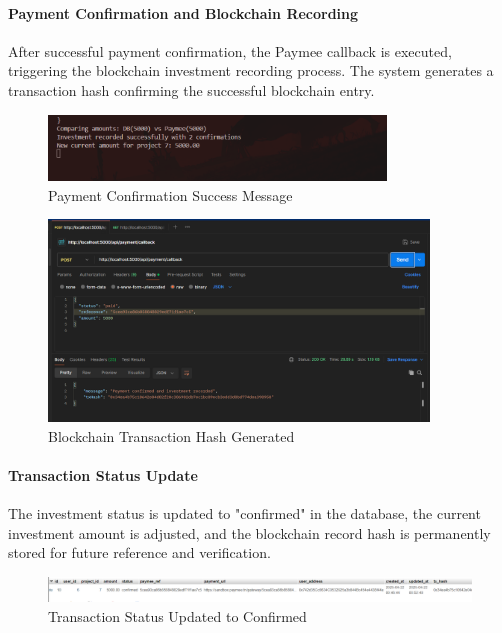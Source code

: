 \paragraph{Payment Confirmation and Blockchain Recording}
After successful payment confirmation, the Paymee callback is executed, triggering the blockchain investment recording process. The system generates a transaction hash confirming the successful blockchain entry.

\begin{figure}[htbp]
    \centering
    \includegraphics[width=0.8\textwidth]{images/payment_confirmation_success.png}
    \caption{Payment Confirmation Success Message}
    \label{fig:payment-confirmation-success}
\end{figure}
\newpage

\begin{figure}[htbp]
    \centering
    \includegraphics[width=0.9\textwidth]{images/blockchain_hash_generated.png}
    \caption{Blockchain Transaction Hash Generated}
    \label{fig:blockchain-hash-generated}
\end{figure}

\paragraph{Transaction Status Update}
The investment status is updated to "confirmed" in the database, the current investment amount is adjusted, and the blockchain record hash is permanently stored for future reference and verification.

\begin{figure}[htbp]
    \centering
    \includegraphics[width=1\textwidth]{images/transaction_confirmed_status.png}
    \caption{Transaction Status Updated to Confirmed}
    \label{fig:transaction-confirmed-status}
\end{figure}

